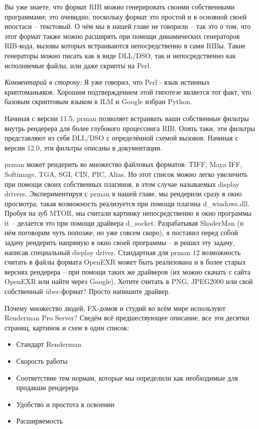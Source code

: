     Вы уже знаете, что формат RIB можно генерировать
     своими собственными программами; это очевидно, поскольку формат это
     простой и в основной своей ипостаси – текстовый. О чём мы в нашей
     главе не говорили – так это о том, что этот формат также можно
     расширять при помощи динамических генераторов RIB-кода, вызовы
     которых встраиваются непосредственно в сами RIBы. Такие генераторы
     можно писать как в виде DLL/DSO, так и непосредственно как
     исполняемые файлы, или даже скрипты на Perl.

     {\it Комментарий в сторону:} Я уже говорил, что Perl -
     язык истинных криптоманьяков. Хорошим подтверждением этой гипотезе
     является тот факт, что базовым скриптовым языком в ILM и Google
     избран Python.

    Начиная с версии 11.5, prman позволяет встраивать
     ваши собственные фильтры внутрь рендерера для более глубокого
     процессинга RIB. Опять таки, эти фильтры представляют из себя
     DLL/DSO с определённой схемой вызовов. Начиная с версии 12.0, эти
     фильтры описаны в документации.

    prman может рендерить во множество файловых
     форматов: TIFF, Maya IFF, Softimage, TGA, SGI, CIN, PIC, Alias. Но
     этот список можно легко увеличить при помощи своих собственных
     плагинов, в этом случае называемых display drivers. Экспериментируя
     с prman в нашей главе, мы рендерили сразу в окно просмотра; такая
     возможность реализуется при помощи плагина d\_windows.dll. Пробуя на
     зуб MTOR, мы считали картинку непосредственно в окно программы it –
     делается это при помощи драйвера d\_socket. Разрабатывая ShaderMan
     (о нём поговорим чуть попозже, но уже совсем скоро), я поставил
     перед собой задачу рендерить напрямую в окно своей программы – и
     решил эту задачу, написав специальный display driver. Стандартная
     для prman 12 возможность считать в файлы формата OpenEXR может быть
     реализована и в более старых версиях рендерера – при помощи таких
     же драйверов (их можно скачать с сайта OpenEXR или найти
     через Google). Хотите
     считать в PNG, JPEG2000 или свой собственный über-формат? Просто
     напишите драйвер.

Почему множество людей, FX-домов и студий во всём
   мире используют Renderman Pro Server? Сведём всё предшествующее
   описание, все эти десятки страниц, картинок и схем в один
   список:

\begin{itemize} 
    \item Стандарт Renderman
    \item Скорость работы
    \item Соответствие тем нормам, которые мы определили как необходимые для продакшн рендерера
    \item Удобство и простота в освоении
    \item Расширяемость
\end{itemize}

